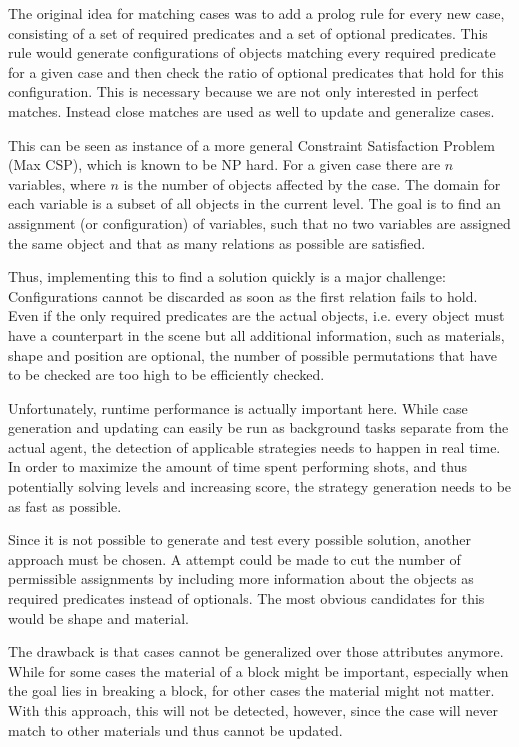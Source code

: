 The original idea for matching cases was to add a prolog rule for every new case, consisting of a set of required predicates and a set of optional predicates.
This rule would generate configurations of objects matching every required predicate for a given case and then check the ratio of optional predicates that hold for this configuration.
This is necessary because we are not only interested in perfect matches. Instead close matches are used as well to update and generalize cases.


This can be seen as instance of a more general Constraint Satisfaction Problem (Max CSP), which is known to be NP hard. For a given case there are $n$ variables, where $n$ is the number of objects affected by the case. The domain for each variable is a subset of all objects in the current level. The goal is to find an assignment (or configuration) of variables, such that no two variables are assigned the same object and that as many relations as possible are satisfied.

Thus, implementing this to find a solution quickly is a major challenge:
Configurations cannot be discarded as soon as the first relation fails to hold.
Even if the only required predicates are the actual objects, i.e. every object must have a counterpart in the scene but all additional information, such as materials, shape and position are optional, the number of possible permutations that have to be checked are too high to be efficiently checked.

Unfortunately, runtime performance is actually important here. While case generation and updating can easily be run as background tasks separate from the actual agent, the detection of applicable strategies needs to happen in real time.
In order to maximize the amount of time spent performing shots, and thus potentially solving levels and increasing score, the strategy generation needs to be as fast as possible.

Since it is not possible to generate and test every possible solution, another approach must be chosen. A attempt could be made to cut the number of permissible assignments by including more information about the objects as required predicates instead of optionals.
The most obvious candidates for this would be shape and material.

The drawback is that cases cannot be generalized over those attributes anymore. While for some cases the material of a block might be important, especially when the goal lies in breaking a block, for other cases the material might not matter.
With this approach, this will not be detected, however, since the case will never match to other materials und thus cannot be updated.

